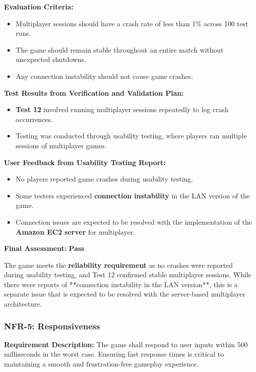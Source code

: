 \documentclass[12pt, titlepage]{article}
\begin{document}
\textbf{Evaluation Criteria:}  
\begin{itemize}
    \item Multiplayer sessions should have a crash rate of less than 1\% across 100 test runs.
    \item The game should remain stable throughout an entire match without unexpected shutdowns.
    \item Any connection instability should not cause game crashes.
\end{itemize}

\textbf{Test Results from Verification and Validation Plan:}  
\begin{itemize}
    \item \textbf{Test 12} involved running multiplayer sessions repeatedly to log crash occurrences.
    \item Testing was conducted through usability testing, where players ran multiple sessions of multiplayer games.
\end{itemize}

\textbf{User Feedback from Usability Testing Report:}  
\begin{itemize}
    \item No players reported game crashes during usability testing.
    \item Some testers experienced \textbf{connection instability} in the LAN version of the game.
    \item Connection issues are expected to be resolved with the implementation of the \textbf{Amazon EC2 server} for multiplayer.
\end{itemize}

\textbf{Final Assessment:} \textbf{Pass}  

The game meets the \textbf{reliability requirement} as no crashes were reported during usability testing, and Test 12 confirmed stable multiplayer sessions. While there were reports of **connection instability in the LAN version**, this is a separate issue that is expected to be resolved with the server-based multiplayer architecture.

\subsubsection{NFR-5: Responsiveness}

\textbf{Requirement Description:}  
The game shall respond to user inputs within 500 milliseconds in the worst case. Ensuring fast response times is critical to maintaining a smooth and frustration-free gameplay experience.
\end{document}
